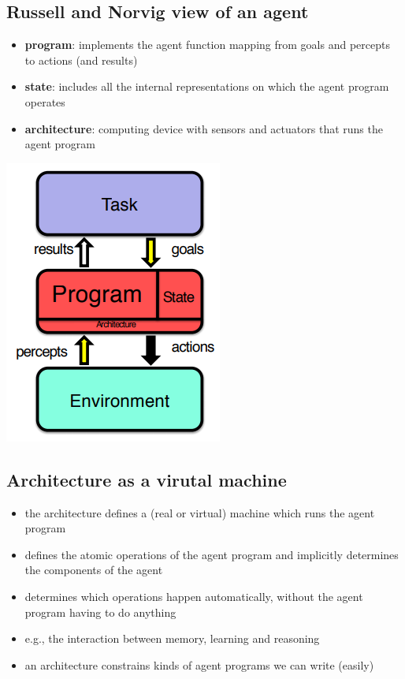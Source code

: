 \documentclass{article}
\begin{document}
\subsection{Russell and Norvig view of an agent}

\begin{multicols}{2}

\begin{itemize}
  \item \textbf{program}: implements the agent function mapping from goals and percepts to actions (and results) 
  \item \textbf{state}: includes all the internal representations on which the agent program operates 
  \item \textbf{architecture}: computing device with sensors and actuators that runs the agent program
\end{itemize}

\includegraphics[scale=0.5]{russel_norvig_agent.png}

\end{multicols}

\subsection{Architecture as a virutal machine}

\begin{itemize}
  \item the architecture defines a (real or virtual) machine which runs the agent program 
  \item defines the atomic operations of the agent program and implicitly determines the components of the agent 
  \item determines which operations happen automatically, without the agent program having to do anything 
  \item e.g., the interaction between memory, learning and reasoning   
  \item an architecture constrains kinds of agent programs we can write (easily)
\end{itemize}
\end{document}
